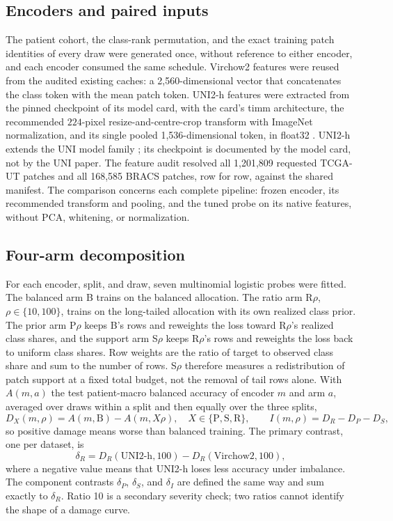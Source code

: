 \documentclass[11pt]{article}
\begin{document}
\subsection{Encoders and paired inputs}
The patient cohort, the class-rank permutation, and the exact training patch identities of every draw were generated once, without reference to either encoder, and each encoder consumed the same schedule. Virchow2 features were reused from the audited existing caches: a 2,560-dimensional vector that concatenates the class token with the mean patch token. UNI2-h features were extracted from the pinned checkpoint of its model card, with the card's timm architecture, the recommended $224$-pixel resize-and-centre-crop transform with ImageNet normalization, and its single pooled 1,536-dimensional token, in float32 \citep{mahmoodlab2025uni2h}. UNI2-h extends the UNI model family \citep{chen2024uni}; its checkpoint is documented by the model card, not by the UNI paper. The feature audit resolved all 1,201,809 requested TCGA-UT patches and all 168,585 BRACS patches, row for row, against the shared manifest. The comparison concerns each complete pipeline: frozen encoder, its recommended transform and pooling, and the tuned probe on its native features, without PCA, whitening, or normalization.

\subsection{Four-arm decomposition}
For each encoder, split, and draw, seven multinomial logistic probes were fitted. The balanced arm B trains on the balanced allocation. The ratio arm R$\rho$, $\rho\in\{10,100\}$, trains on the long-tailed allocation with its own realized class prior. The prior arm P$\rho$ keeps B's rows and reweights the loss toward R$\rho$'s realized class shares, and the support arm S$\rho$ keeps R$\rho$'s rows and reweights the loss back to uniform class shares. Row weights are the ratio of target to observed class share and sum to the number of rows. S$\rho$ therefore measures a redistribution of patch support at a fixed total budget, not the removal of tail rows alone. With $A(m,a)$ the test patient-macro balanced accuracy of encoder $m$ and arm $a$, averaged over draws within a split and then equally over the three splits,
\begin{equation}
  D_X(m,\rho) = A(m,\mathrm{B}) - A(m,X\rho), \quad X\in\{\mathrm{P},\mathrm{S},\mathrm{R}\}, \qquad
  I(m,\rho) = D_R - D_P - D_S ,
  \label{eq:damage}
\end{equation}
\noindent so positive damage means worse than balanced training. The primary contrast, one per dataset, is
\begin{equation}
  \delta_R = D_R(\text{UNI2-h},100) - D_R(\text{Virchow2},100),
  \label{eq:primary}
\end{equation}
\noindent where a negative value means that UNI2-h loses less accuracy under imbalance. The component contrasts $\delta_P$, $\delta_S$, and $\delta_I$ are defined the same way and sum exactly to $\delta_R$. Ratio 10 is a secondary severity check; two ratios cannot identify the shape of a damage curve.
\end{document}
